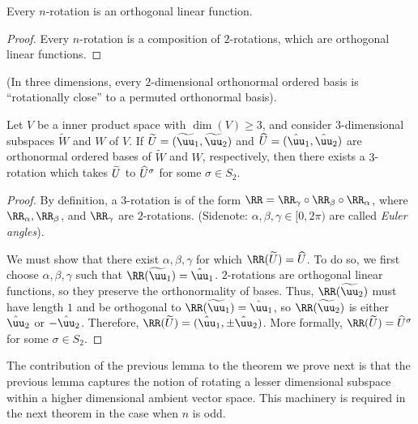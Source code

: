 \begin{theorem}
\label{ch::exterior_pwrs::thm::n_dim_rot_det_1}
    Every $n$-rotation is an orthogonal linear function.
\end{theorem}

\begin{proof}
    Every $n$-rotation is a composition of $2$-rotations, which are orthogonal linear functions.
\end{proof}

\begin{lemma}
\label{ch::exterior_pwrs::thm::3_rot_acts_on_subspaces}
    (In three dimensions, every $2$-dimensional orthonormal ordered basis is ``rotationally close'' to a permuted orthonormal basis).
    
    Let $V$ be a inner product space with $\dim(V) \geq 3$, and consider $3$-dimensional subspaces $\widetilde{W}$ and $W$ of $V$. If $\tU = ( \tuu_1, \tuu_2 )$ and $\hU = ( \huu_1, \huu_2 )$ are orthonormal ordered bases of $\widetilde{W}$ and $W$, respectively, then there exists a $3$-rotation which takes $\widetilde{U}$ to $\widehat{U}^\sigma$ for some $\sigma \in S_2$.
\end{lemma}

\begin{proof}
   By definition, a $3$-rotation is of the form $\RR = \RR_\gamma \circ \RR_\beta \circ \RR_\alpha$, where $\RR_\alpha, \RR_\beta$, and $\RR_\gamma$ are $2$-rotations. (Sidenote: $\alpha, \beta, \gamma \in [0, 2\pi)$ are called \textit{Euler angles}).
   
   We must show that there exist $\alpha, \beta, \gamma$ for which $\RR(\tU) = \hU$. To do so, we first choose $\alpha, \beta, \gamma$ such that $\RR(\tuu_1) = \huu_1$. $2$-rotations are orthogonal linear functions, so they preserve the orthonormality of bases. Thus, $\RR(\tuu_2)$ must have length $1$ and be orthogonal to $\RR(\tuu_1) = \huu_1$, so $\RR(\tuu_2)$ is either $\huu_2$ or $-\huu_2$. Therefore, $\RR(\tU) = (\huu_1, \pm \huu_2 )$. More formally, $\RR(\tU) =\hU^\sigma$ for some $\sigma \in S_2$.
   
\end{proof}

\begin{remark}
    The contribution of the previous lemma to the theorem we prove next is that the previous lemma captures the notion of rotating a lesser dimensional subspace within a higher dimensional ambient vector space. This machinery is required in the next theorem in the case when $n$ is odd.
\end{remark}

